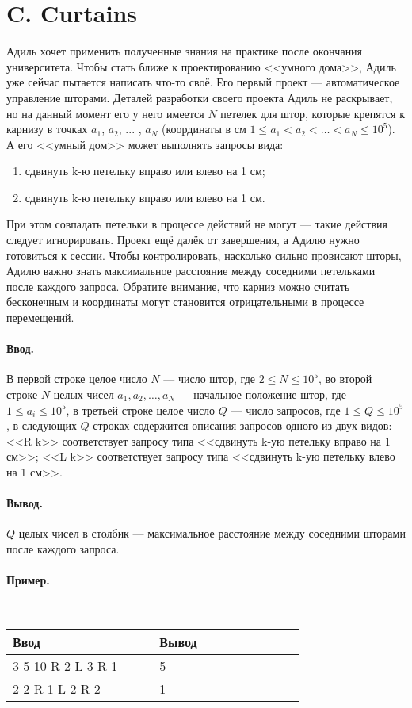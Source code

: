 \documentclass[12pt, a5paper]{article}
\newcommand{\informat}[1]
{
	\paragraph{Ввод.\\} #1
}
\newcommand{\outformat}[1]
{
	\paragraph{Вывод.\\} #1
}
\newcommand{\examplee}[4]
{
	\paragraph{Пример.\\}
	{\tt
	\begin{tabular}{|p{0.4\linewidth}|p{0.4\linewidth}|}
	\hline
	Ввод 	& Вывод  	\\
	\hline
	#1 		& #2 		\\
	\hline
	#3		& #4		\\
	\hline
	\end{tabular}
	}
}
\begin{document}
\section*{C. Curtains}

Адиль хочет применить полученные знания на практике после окончания университета. Чтобы стать ближе к проектированию <<умного дома>>, Адиль уже сейчас пытается написать что-то своё. Его первый проект --- автоматическое управление шторами. Деталей разработки своего проекта Адиль не раскрывает, но на данный момент его у него имеется $N$ петелек для штор, которые крепятся к карнизу в точках $a_1$, $a_2$, ... , $a_N$ (координаты в см \mbox{$1 \le a_1 < a_2 < \dots < a_N \le 10^5$}). А его <<умный дом>> может выполнять запросы вида:
\begin{enumerate}
\item сдвинуть k-ю петельку вправо или влево на 1 см;
\item сдвинуть k-ю петельку вправо или влево на 1 см.
\end{enumerate}
При этом совпадать петельки в процессе действий не могут --- такие действия следует игнорировать. Проект ещё далёк от завершения, а Адилю нужно готовиться к сессии. Чтобы контролировать, насколько сильно провисают шторы, Адилю важно знать максимальное расстояние между соседними петельками после каждого запроса. Обратите внимание, что карниз можно считать бесконечным и координаты могут становится отрицательными в процессе перемещений.

\informat{В первой строке целое число $N$ --- число штор, где $2 \le N \le 10^5$, \newline
во второй строке $N$ целых чисел $a_1, a_2, \dots, a_N$ --- начальное положение штор, где $1 \le a_i \le 10^5$, \newline
в третьей строке целое число $Q$ --- число запросов, где $1 \le Q \le 10^5$, \newline
в следующих $Q$ строках содержится описания запросов одного из двух видов: \newline
<<R k>> соответствует запросу типа <<сдвинуть k-ую петельку вправо на 1 см>>; \newline
<<L k>> соответствует запросу типа <<сдвинуть k-ую петельку влево на 1 см>>.}

\outformat{$Q$ целых чисел в столбик --- максимальное расстояние между соседними шторами после каждого запроса.}

\examplee{
3 \newline
1 5 10 \newline
3 \newline
R 2 \newline
L 3 \newline
R 1
}
{
5 \newline 5 \newline 4
}
{
2 \newline
1 2 \newline 
3 \newline
R 1 \newline
L 2 \newline
R 2 \newline
}{
1 \newline 1 \newline 2
}
\end{document}
